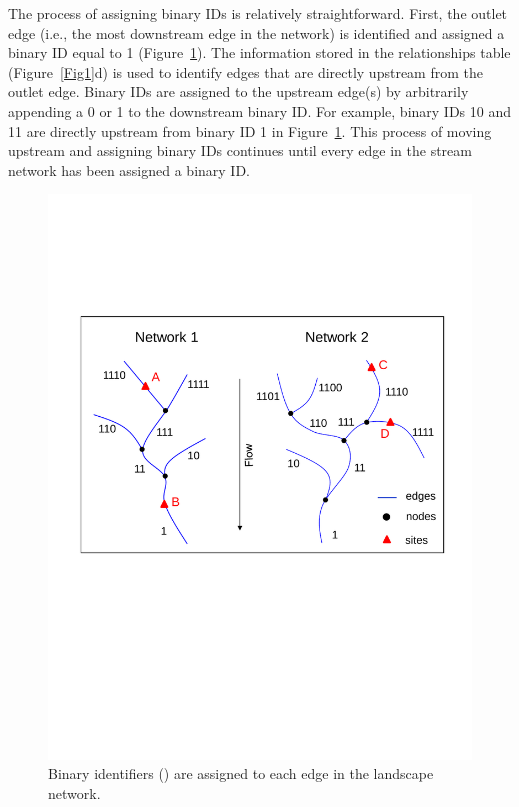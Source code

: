 \documentclass[article]{jss}
\begin{document}
The process of assigning binary IDs is relatively straightforward. First, the outlet edge (i.e., the most downstream edge in the network) is identified and assigned a binary ID equal to 1 (Figure~\ref{Fig7}). The information stored in the relationships table (Figure~\ref{Fig1}d) is used to identify edges that are directly upstream from the outlet edge. Binary IDs are assigned to the upstream edge(s) by arbitrarily appending a 0 or 1 to the downstream binary ID. For example, binary IDs 10 and 11 are directly upstream from binary ID 1 in Figure~\ref{Fig7}. This process of moving upstream and assigning binary IDs continues until every edge in the stream network has been assigned a binary ID.
\begin{figure}[htbp]
  \begin{center}
    \includegraphics[width=350pt,keepaspectratio]{Figures/Fig7.pdf}
  \end{center}
  \caption{Binary identifiers () are assigned to each edge in the landscape network. \label{Fig7}}
\end{figure}
\end{document}
